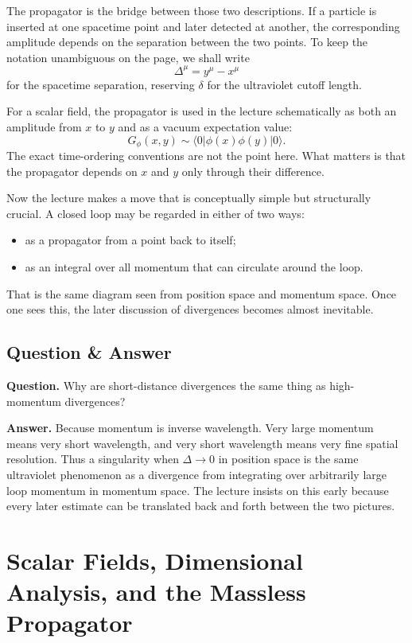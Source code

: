The propagator is the bridge between those two descriptions. If a particle is inserted at one spacetime point and later detected at another, the corresponding amplitude depends on the separation between the two points. To keep the notation unambiguous on the page, we shall write
\begin{equation}
\Delta^\mu = y^\mu - x^\mu
\end{equation}
for the spacetime separation, reserving \(\delta\) for the ultraviolet cutoff length.

For a scalar field, the propagator is used in the lecture schematically as both an amplitude from \(x\) to \(y\) and as a vacuum expectation value:
\begin{equation}
G_\phi(x,y) \sim \langle 0 | \phi(x)\phi(y) |0\rangle .
\end{equation}
The exact time-ordering conventions are not the point here. What matters is that the propagator depends on \(x\) and \(y\) only through their difference.

Now the lecture makes a move that is conceptually simple but structurally crucial. A closed loop may be regarded in either of two ways:
\begin{itemize}
\item as a propagator from a point back to itself;
\item as an integral over all momentum that can circulate around the loop.
\end{itemize}
That is the same diagram seen from position space and momentum space. Once one sees this, the later discussion of divergences becomes almost inevitable.

\subsection{Question \& Answer}

\textbf{Question.} Why are short-distance divergences the same thing as high-momentum divergences?

\textbf{Answer.} Because momentum is inverse wavelength. Very large momentum means very short wavelength, and very short wavelength means very fine spatial resolution. Thus a singularity when \(\Delta \to 0\) in position space is the same ultraviolet phenomenon as a divergence from integrating over arbitrarily large loop momentum in momentum space. The lecture insists on this early because every later estimate can be translated back and forth between the two pictures.

\section{Scalar Fields, Dimensional Analysis, and the Massless Propagator}

